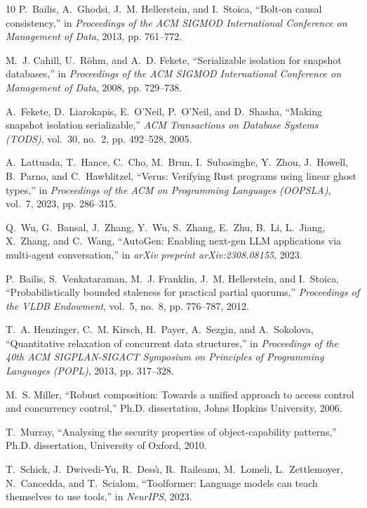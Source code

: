 \documentclass[journal,compsoc,10pt]{IEEEtran}
\theoremstyle{definition}
\theoremstyle{remark}
\begin{document}
\begin{thebibliography}{10}
P.~Bailis, A.~Ghodsi, J.~M. Hellerstein, and I.~Stoica, ``Bolt-on causal
  consistency,'' in \emph{Proceedings of the {ACM} {SIGMOD} International
  Conference on Management of Data}, 2013, pp. 761--772.

M.~J. Cahill, U.~R{\"o}hm, and A.~D. Fekete, ``Serializable isolation for
  snapshot databases,'' in \emph{Proceedings of the {ACM} {SIGMOD}
  International Conference on Management of Data}, 2008, pp. 729--738.

A.~Fekete, D.~Liarokapis, E.~O'Neil, P.~O'Neil, and D.~Shasha, ``Making
  snapshot isolation serializable,'' \emph{ACM Transactions on Database Systems
  ({TODS})}, vol.~30, no.~2, pp. 492--528, 2005.

A.~Lattuada, T.~Hance, C.~Cho, M.~Brun, I.~Subasinghe, Y.~Zhou, J.~Howell,
  B.~Parno, and C.~Hawblitzel, ``Verus: Verifying {Rust} programs using linear
  ghost types,'' in \emph{Proceedings of the {ACM} on Programming Languages
  (OOPSLA)}, vol.~7, 2023, pp. 286--315.

Q.~Wu, G.~Bansal, J.~Zhang, Y.~Wu, S.~Zhang, E.~Zhu, B.~Li, L.~Jiang, X.~Zhang,
  and C.~Wang, ``{AutoGen}: Enabling next-gen {LLM} applications via
  multi-agent conversation,'' in \emph{arXiv preprint arXiv:2308.08155}, 2023.

P.~Bailis, S.~Venkataraman, M.~J. Franklin, J.~M. Hellerstein, and I.~Stoica,
  ``Probabilistically bounded staleness for practical partial quorums,''
  \emph{Proceedings of the {VLDB} Endowment}, vol.~5, no.~8, pp. 776--787,
  2012.

T.~A. Henzinger, C.~M. Kirsch, H.~Payer, A.~Sezgin, and A.~Sokolova,
  ``Quantitative relaxation of concurrent data structures,'' in
  \emph{Proceedings of the 40th {ACM} {SIGPLAN-SIGACT} Symposium on Principles
  of Programming Languages ({POPL})}, 2013, pp. 317--328.

M.~S. Miller, ``Robust composition: Towards a unified approach to access
  control and concurrency control,'' Ph.D. dissertation, Johns Hopkins
  University, 2006.

T.~Murray, ``Analysing the security properties of object-capability patterns,''
  Ph.D. dissertation, University of Oxford, 2010.

T.~Schick, J.~Dwivedi-Yu, R.~Dess{\`\i}, R.~Raileanu, M.~Lomeli,
  L.~Zettlemoyer, N.~Cancedda, and T.~Scialom, ``Toolformer: Language models
  can teach themselves to use tools,'' in \emph{NeurIPS}, 2023.


\end{thebibliography}
\end{document}
